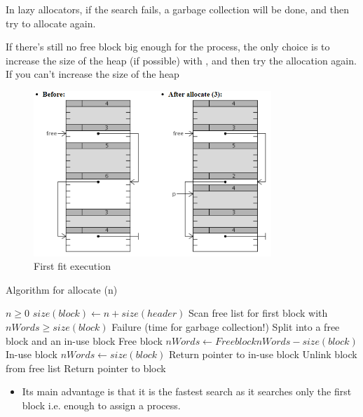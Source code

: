 In lazy allocators, if the search fails, a garbage collection will be done, and then try to allocate again.

If there’s still no free block big enough for the process, the only choice is to increase the size of the heap (if possible) with , and then try the allocation again.
If you can’t increase the size of the heap

\begin{figure}[htbp]
    \begin{center}
        \includegraphics[width=0.8\textwidth]{figures/FF_alg}
    \caption{First fit execution }
    \label{ff_alg}
    \end{center}
\end{figure}

\begin{algorithm}
\caption{Algorithm for allocate (n)}
\begin{algorithmic} 
\REQUIRE $n \geq 0$
\STATE $size(block) \leftarrow n + size(header)$  
\STATE Scan free list for first block with $nWords \geq size(block)$ 
  \STATE Failure (time for garbage collection!) 
   \STATE Split into a free block and an in-use block 
   \STATE Free block $nWords \leftarrow Free block nWords - size(block) $
   \STATE In-use block $nWords \leftarrow size(block) $
    \STATE Return pointer to in-use block 
\ELSE 
    \STATE Unlink block from free list 
    \STATE Return pointer to block 
\ENDIF
\end{algorithmic}
\end{algorithm}

\begin{itemize}
\item Its main advantage is that it is the fastest search as it searches only the first block i.e. enough to assign a process.
\end{itemize}

